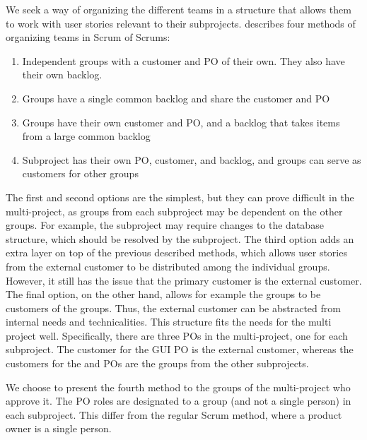 \begin{description}
  We seek a way of organizing the different teams in a structure that allows them to work with user stories relevant to their subprojects. \textcite{bird_davies_2007} describes four methods of organizing teams in Scrum of Scrums:
  \begin{enumerate}
    \item Independent groups with a customer and PO of their own. They also have their own backlog.
    \item Groups have a single common backlog and share the customer and PO
    \item Groups have their own customer and PO, and a backlog that takes items from a large common backlog
    \item Subproject has their own PO, customer, and backlog, and groups can serve as customers for other groups
  \end{enumerate}
  The first and second options are the simplest, but they can prove difficult in the multi-project, as groups from each subproject may be dependent on the other groups. For example, the \gui subproject may require changes to the database structure, which should be resolved by the \db subproject. The third option adds an extra layer on top of the previous described methods, which allows user stories from the external customer to be distributed among the individual groups. However, it still has the issue that the primary customer is the external customer. The final option, on the other hand, allows for example the \gui groups to be customers of the \bd groups. Thus, the external customer can be abstracted from internal needs and technicalities. This structure fits the needs for the multi project well. Specifically, there are three POs in the multi-project, one for each subproject. The customer for the GUI PO is the external customer, whereas the customers for the \db and \bd POs are the groups from the other subprojects.

  We choose to present the fourth method to the groups of the multi-project who approve it. The PO roles are designated to a group (and not a single person) in each subproject. This differ from the regular Scrum method, where a product owner is a single person.


\end{description}
